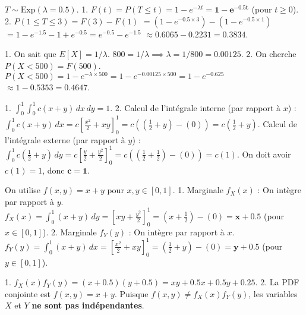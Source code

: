 \begin{correctionbox}
$T \sim \text{Exp}(\lambda=0.5)$.
1.  $F(t) = P(T \le t) = 1 - e^{-\lambda t} = \mathbf{1 - e^{-0.5 t}}$ (pour $t \ge 0$).
2.  $P(1 \le T \le 3) = F(3) - F(1)$
    $= (1 - e^{-0.5 \times 3}) - (1 - e^{-0.5 \times 1})$
    $= 1 - e^{-1.5} - 1 + e^{-0.5} = e^{-0.5} - e^{-1.5}$
    $\approx 0.6065 - 0.2231 = \mathbf{0.3834}$.
\end{correctionbox}

\begin{correctionbox}
1.  On sait que $E[X] = 1/\lambda$.
    $800 = 1/\lambda \implies \lambda = 1/800 = \mathbf{0.00125}$.
2.  On cherche $P(X < 500) = F(500)$.
    $P(X < 500) = 1 - e^{-\lambda \times 500} = 1 - e^{-0.00125 \times 500} = 1 - e^{-0.625}$
    $\approx 1 - 0.5353 = \mathbf{0.4647}$.
\end{correctionbox}


\begin{correctionbox}
1.  $\int_{0}^1 \int_{0}^1 c(x+y) \, dx \, dy = 1$.
2.  Calcul de l'intégrale interne (par rapport à $x$) :
    $\int_0^1 c(x+y) \, dx = c \left[ \frac{x^2}{2} + xy \right]_0^1 = c \left( (\frac{1}{2} + y) - (0) \right) = c(\frac{1}{2} + y)$.
    Calcul de l'intégrale externe (par rapport à $y$) :
    $\int_0^1 c(\frac{1}{2} + y) \, dy = c \left[ \frac{y}{2} + \frac{y^2}{2} \right]_0^1 = c \left( (\frac{1}{2} + \frac{1}{2}) - (0) \right) = c(1)$.
    On doit avoir $c(1) = 1$, donc $\mathbf{c=1}$.
\end{correctionbox}

\begin{correctionbox}
On utilise $f(x,y) = x+y$ pour $x,y \in [0,1]$.
1.  Marginale $f_X(x)$ : On intègre par rapport à $y$.
    $f_X(x) = \int_0^1 (x+y) \, dy = \left[ xy + \frac{y^2}{2} \right]_0^1 = (x + \frac{1}{2}) - (0) = \mathbf{x + 0.5}$ (pour $x \in [0,1]$).
2.  Marginale $f_Y(y)$ : On intègre par rapport à $x$.
    $f_Y(y) = \int_0^1 (x+y) \, dx = \left[ \frac{x^2}{2} + xy \right]_0^1 = (\frac{1}{2} + y) - (0) = \mathbf{y + 0.5}$ (pour $y \in [0,1]$).
\end{correctionbox}

\begin{correctionbox}
1.  $f_X(x) f_Y(y) = (x + 0.5)(y + 0.5) = xy + 0.5x + 0.5y + 0.25$.
2.  La PDF conjointe est $f(x,y) = x+y$.
    Puisque $f(x,y) \neq f_X(x) f_Y(y)$, les variables $X$ et $Y$ \textbf{ne sont pas indépendantes}.
\end{correctionbox}

